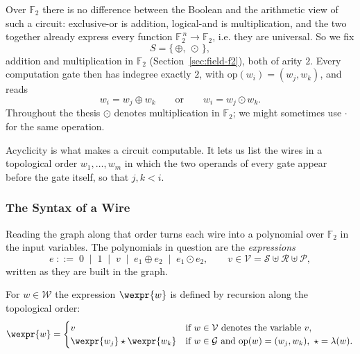 
Over $\mathbb{F}_2$ there is no difference between the Boolean and the arithmetic
view of such a circuit: exclusive-or is addition, logical-and is
multiplication, and the two together already express every function
$\mathbb{F}_2^{\,n} \to \mathbb{F}_2$, i.e. they are universal. So we fix
\[
  S = \{\,\oplus,\ \odot\,\},
\]
addition and multiplication in $\mathbb{F}_2$ (Section~\ref{sec:field-f2}), both
of arity $2$. Every computation gate then has indegree exactly $2$, with
$\mathrm{op}(w_i) = (w_j, w_k)$, and reads
\[
  w_i = w_j \oplus w_k \qquad \text{or} \qquad w_i = w_j \odot w_k .
\]
Throughout the thesis $\odot$ denotes multiplication in $\mathbb{F}_2$; we
might sometimes use $\cdot$ for the same operation.

Acyclicity is what makes a circuit computable. It lets us list the wires in a
topological order $w_1, \dots, w_m$ in which the two operands of every gate
appear before the gate itself, so that $j, k < i$.

  \subsubsection{The Syntax of a Wire}

  Reading the graph along that order turns each wire into a polynomial over
  $\mathbb{F}_2$ in the input variables. The polynomials in question are the
  \emph{expressions}
  \[
    e \;::=\; 0 \;\mid\; 1 \;\mid\; v \;\mid\; e_1 \oplus e_2 \;\mid\; e_1 \odot e_2,
    \qquad v \in \mathcal{V} = \mathcal{S} \uplus \mathcal{R} \uplus \mathcal{P},
  \]
  written as they are built in the graph.

  \begin{definition}
  \label{def:wire-expr}
  For $w \in \mathcal{W}$ the expression $\wexpr{w}$ is defined by recursion along
  the topological order:
  \[
    \wexpr{w} =
    \begin{cases}
      v & \text{if } w \in \mathcal{V} \text{ denotes the variable } v, \\
      \wexpr{w_j} \star \wexpr{w_k}
        & \text{if } w \in \mathcal{G} \text{ and } \mathrm{op}(w) = (w_j, w_k),\ \star = \lambda(w).
    \end{cases}
  \]
  \end{definition}

